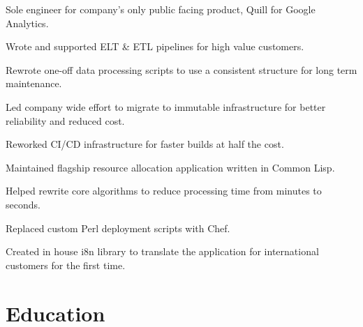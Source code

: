 \documentclass[]{deedy-resume-openfont}
\begin{document}
\sectionsep
{}
\vspace{\topsep}
\begin{tightemize}
\item Sole engineer for company's only public facing product, Quill for Google Analytics.
\item Wrote and supported ELT \& ETL pipelines for high value customers.
\item Rewrote one-off data processing scripts to use a consistent structure for long term maintenance.
\item Led company wide effort to migrate to immutable infrastructure for better reliability and reduced cost.
\item Reworked CI/CD infrastructure for faster builds at half the cost.
\end{tightemize}

\sectionsep
{}
\vspace{\topsep}
\begin{tightemize}
\item Maintained flagship resource allocation application written in Common Lisp.
\item Helped rewrite core algorithms to reduce processing time from minutes to seconds.
\item Replaced custom Perl deployment scripts with Chef.
\item Created in house i8n library to translate the application for international customers for the first time.
\end{tightemize}

\section{Education}
\sectionsep

\sectionsep
\end{document}
